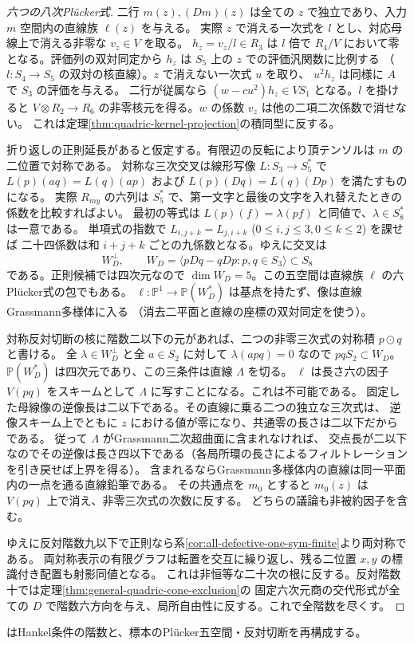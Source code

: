 \begin{proof}[六つの八次Plücker式]
二行 $m(z),(Dm)(z)$ は全ての $z$ で独立であり、入力 $m$ 空間内の直線族 $\ell(z)$ を与える。
実際 $z$ で消える一次式を $l$ とし、対応母線上で消える非零な $v_z\in V$ を取る。
$h_z=v_z/l\in R_3$ は $l$ 倍で $R_4/V$ において零となる。評価列の双対同定から
$h_z$ は $S_5$ 上の $z$ での評価汎関数に比例する
（$l:S_4\to S_5$ の双対の核直線）。$z$ で消えない一次式 $u$ を取り、
$u^2 h_z$ は同様に $A$ で $S_3$ の評価を与える。
二行が従属なら $(w-c u^2)h_z\in V S_1$ となる。$l$ を掛けると
$V\otimes R_2\to R_6$ の非零核元を得る。$w$ の係数 $v_z$ は他の二項二次係数で消せない。
これは定理\ref{thm:quadric-kernel-projection}の積同型に反する。

折り返しの正則延長があると仮定する。有限辺の反転により頂テンソルは $m$ の二位置で対称である。
対称な三次交叉は線形写像 $L:S_3\to S_5^*$ で
$L(p)(a q)=L(q)(a p)$ および $L(p)(Dq)=L(q)(Dp)$ を満たすものになる。
実際 $R_{my}$ の六列は $S_5^*$ で、第一文字と最後の文字を入れ替えたときの係数を比較すればよい。
最初の等式は $L(p)(f)=\lambda(p f)$ と同値で、$\lambda\in S_8^*$ は一意である。
単項式の指数で $L_{i,j+k}=L_{j,i+k}$ ($0\le i,j\le3,0\le k\le2$) を課せば
二十四係数は和 $i+j+k$ ごとの九係数となる。ゆえに交叉は
\[
       W_D^\perp,\qquad W_D=\langle pDq-qDp:p,q\in S_3\rangle\subset S_8
\]
である。正則候補では四次元なので $\dim W_D=5$。この五空間は直線族 $\ell$ の六Plücker式の包でもある。
$\ell:\mathbb P^1\to\mathbb P(W_D^*)$ は基点を持たず、像は直線Grassmann多様体に入る
（消去二平面と直線の座標の双対同定を使う）。

対称反対切断の核に階数二以下の元があれば、二つの非零三次式の対称積 $p\odot q$ と書ける。
全 $\lambda\in W_D^\perp$ と全 $a\in S_2$ に対して $\lambda(a p q)=0$ なので
$pqS_2\subset W_D$。$\mathbb P(W_D^*)$ は四次元であり、この三条件は直線 $\Lambda$ を切る。
$\ell$ は長さ六の因子 $V(pq)$ をスキームとして $\Lambda$ に写すことになる。これは不可能である。
固定した母線像の逆像長は二以下である。その直線に乗る二つの独立な三次式は、
逆像スキーム上でともに $z$ における値が零になり、共通零の長さは二以下だからである。
従って $\Lambda$ がGrassmann二次超曲面に含まれなければ、
交点長が二以下なのでその逆像は長さ四以下である（各局所環の長さによるフィルトレーションを引き戻せば上界を得る）。
含まれるならGrassmann多様体内の直線は同一平面内の一点を通る直線鉛筆である。
その共通点を $m_0$ とすると $m_0(z)$ は $V(pq)$ 上で消え、非零三次式の次数に反する。
どちらの議論も非被約因子を含む。

ゆえに反対階数九以下で正則なら系\ref{cor:all-defective-one-sym-finite}より両対称である。
両対称表示の有限グラフは転置を交互に繰り返し、残る二位置 $x,y$ の標識付き配置も射影同値となる。
これは非恒等な二十次の根に反する。反対階数十では定理\ref{thm:general-quadric-cone-exclusion}の
固定六次元商の交代形式が全ての $D$ で階数六方向を与え、局所自由性に反する。これで全階数を尽くす。
\end{proof}
 はHankel条件の階数と、標本のPlücker五空間・反対切断を再構成する。
